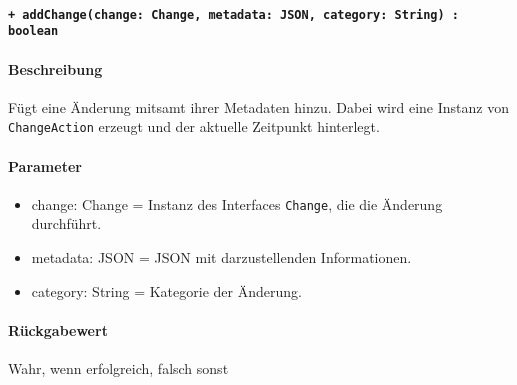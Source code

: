 \paragraph{\texttt{+ addChange(change: Change, metadata: JSON, category: String) : boolean}}%
\paragraph*{Beschreibung}
Fügt eine Änderung mitsamt ihrer Metadaten hinzu.
Dabei wird eine Instanz von \verb#ChangeAction# erzeugt und der aktuelle Zeitpunkt hinterlegt.
\paragraph*{Parameter}
\begin{itemize}
    \item change: Change = Instanz des Interfaces \verb#Change#, die die Änderung durchführt.
    \item metadata: JSON = JSON mit darzustellenden Informationen.
    \item category: String = Kategorie der Änderung.
\end{itemize}
\paragraph*{Rückgabewert}
Wahr, wenn erfolgreich, falsch sonst
